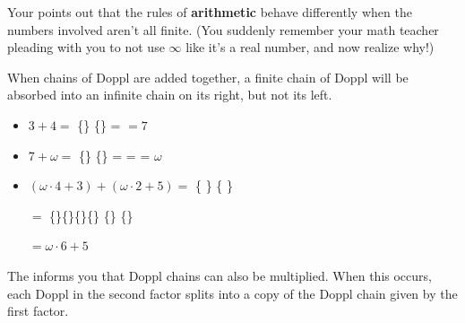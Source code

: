 \newpage

Your \mappMobidex{} points out that the rules of
\textbf{arithmetic} behave differently when the numbers involved aren't all
finite. (You suddenly remember your math teacher pleading with you to not
use \(\infty\) like it's a real number, and now realize why!)

When chains of Doppl are added
together, a finite chain of Doppl will be absorbed into an infinite chain
on its right, but not its left.

\begin{itemize}
\item \(3+4=\) \{\mappDoppl\mappDoppl\mappDoppl\}%
\{\mappDoppl\mappDoppl\mappDoppl\mappDoppl\} =
\mappDoppl\mappDoppl\mappDoppl\mappDoppl\mappDoppl\mappDoppl\mappDoppl{}
\(=7\)

\item \(7+\omega=\)
\{\mappDoppl\mappDoppl\mappDoppl\mappDoppl\mappDoppl\mappDoppl\mappDoppl\}%
\{\mappDopplOmega\} =
\mappDoppl\mappDoppl\mappDoppl\mappDoppl\mappDoppl\mappDoppl\mappDoppl%
\mappDopplOmega =
\mappDopplOmega{} =
\(\omega\)

\item \((\omega\cdot4+3)+(\omega\cdot2+5)=\)
\{\mappDopplOmega\mappDopplOmega\mappDopplOmega\mappDopplOmega\mappDoppl
\mappDoppl\mappDoppl\}%
\{\mappDopplOmega\mappDopplOmega\mappDoppl\mappDoppl\mappDoppl\mappDoppl
\mappDoppl\}

\hspace{1.55in} \(=\)
\{\mappDopplOmega\}\{\mappDopplOmega\}\{\mappDopplOmega\}\{\mappDopplOmega\}%
\{\mappDoppl\mappDoppl\mappDoppl\mappDopplOmega\}%
\{\mappDopplOmega\}\mappDoppl\mappDoppl\mappDoppl\mappDoppl\mappDoppl{}

\hspace{1.55in} \(=\omega\cdot6+5\)
\end{itemize}

The \mappMobidex{} informs you that
Doppl chains can also be multiplied. When this occurs, each Doppl in the second
factor splits into a copy of the Doppl chain given by the first factor.

